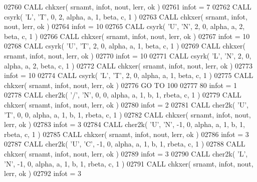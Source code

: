 \begin{DoxyCode}
02760       \textcolor{keyword}{CALL }chkxer( srnamt, infot, nout, lerr, ok )
02761       infot = 7
02762       \textcolor{keyword}{CALL }csyrk( \textcolor{stringliteral}{'L'}, \textcolor{stringliteral}{'T'}, 0, 2, alpha, a, 1, beta, c, 1 )
02763       \textcolor{keyword}{CALL }chkxer( srnamt, infot, nout, lerr, ok )
02764       infot = 10
02765       \textcolor{keyword}{CALL }csyrk( \textcolor{stringliteral}{'U'}, \textcolor{stringliteral}{'N'}, 2, 0, alpha, a, 2, beta, c, 1 )
02766       \textcolor{keyword}{CALL }chkxer( srnamt, infot, nout, lerr, ok )
02767       infot = 10
02768       \textcolor{keyword}{CALL }csyrk( \textcolor{stringliteral}{'U'}, \textcolor{stringliteral}{'T'}, 2, 0, alpha, a, 1, beta, c, 1 )
02769       \textcolor{keyword}{CALL }chkxer( srnamt, infot, nout, lerr, ok )
02770       infot = 10
02771       \textcolor{keyword}{CALL }csyrk( \textcolor{stringliteral}{'L'}, \textcolor{stringliteral}{'N'}, 2, 0, alpha, a, 2, beta, c, 1 )
02772       \textcolor{keyword}{CALL }chkxer( srnamt, infot, nout, lerr, ok )
02773       infot = 10
02774       \textcolor{keyword}{CALL }csyrk( \textcolor{stringliteral}{'L'}, \textcolor{stringliteral}{'T'}, 2, 0, alpha, a, 1, beta, c, 1 )
02775       \textcolor{keyword}{CALL }chkxer( srnamt, infot, nout, lerr, ok )
02776       \textcolor{keywordflow}{GO TO} 100
02777    80 infot = 1
02778       \textcolor{keyword}{CALL }cher2k( \textcolor{stringliteral}{'/'}, \textcolor{stringliteral}{'N'}, 0, 0, alpha, a, 1, b, 1, rbeta, c, 1 )
02779       \textcolor{keyword}{CALL }chkxer( srnamt, infot, nout, lerr, ok )
02780       infot = 2
02781       \textcolor{keyword}{CALL }cher2k( \textcolor{stringliteral}{'U'}, \textcolor{stringliteral}{'T'}, 0, 0, alpha, a, 1, b, 1, rbeta, c, 1 )
02782       \textcolor{keyword}{CALL }chkxer( srnamt, infot, nout, lerr, ok )
02783       infot = 3
02784       \textcolor{keyword}{CALL }cher2k( \textcolor{stringliteral}{'U'}, \textcolor{stringliteral}{'N'}, -1, 0, alpha, a, 1, b, 1, rbeta, c, 1 )
02785       \textcolor{keyword}{CALL }chkxer( srnamt, infot, nout, lerr, ok )
02786       infot = 3
02787       \textcolor{keyword}{CALL }cher2k( \textcolor{stringliteral}{'U'}, \textcolor{stringliteral}{'C'}, -1, 0, alpha, a, 1, b, 1, rbeta, c, 1 )
02788       \textcolor{keyword}{CALL }chkxer( srnamt, infot, nout, lerr, ok )
02789       infot = 3
02790       \textcolor{keyword}{CALL }cher2k( \textcolor{stringliteral}{'L'}, \textcolor{stringliteral}{'N'}, -1, 0, alpha, a, 1, b, 1, rbeta, c, 1 )
02791       \textcolor{keyword}{CALL }chkxer( srnamt, infot, nout, lerr, ok )
02792       infot = 3

\end{DoxyCode}
